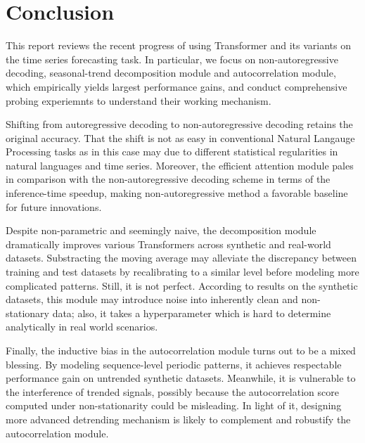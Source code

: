 \documentclass[12pt]{article}
\begin{document}
\section{Conclusion}
This report reviews the recent progress of using Transformer and its variants on the time series forecasting task. 
In particular, we focus on non-autoregressive decoding, seasonal-trend decomposition module and autocorrelation module, which empirically yields largest performance gains, and conduct comprehensive probing experiemnts to understand their working mechanism. 

Shifting from autoregressive decoding to non-autoregressive decoding retains the original accuracy. 
That the shift is not as easy in conventional Natural Langauge Processing tasks as in this case may due to different statistical regularities in natural languages and time series. 
Moreover, the efficient attention module pales in comparison with the non-autoregressive decoding scheme in terms of the inference-time speedup, making non-autoregressive method a favorable baseline for future innovations. 

Despite non-parametric and seemingly naive, the decomposition module dramatically improves various Transformers across synthetic and real-world datasets. 
Substracting the moving average may alleviate the discrepancy between training and test datasets by recalibrating to a similar level before modeling more complicated patterns. 
Still, it is not perfect. According to results on the synthetic datasets, this module may introduce noise into inherently clean and non-stationary data; also, it takes a hyperparameter which is hard to determine analytically in real world scenarios. 

Finally, the inductive bias in the autocorrelation module turns out to be a mixed blessing. 
By modeling sequence-level periodic patterns, it achieves respectable performance gain on untrended synthetic datasets.
Meanwhile, it is vulnerable to the interference of trended signals, possibly because the autocorrelation score computed under non-stationarity could be misleading. 
In light of it, designing more advanced detrending mechanism is likely to complement and robustify the autocorrelation module. 


\newpage




\newpage

\end{document}
